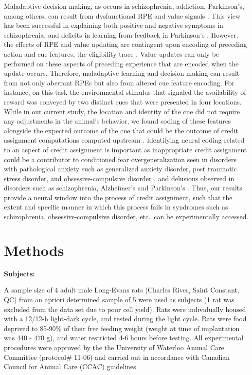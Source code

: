 \documentclass[11pt]{article}
\let\cite=\citep
\begin{document}
Maladaptive decision making, as occurs in schizophrenia, addiction, Parkinson's, among others, can result from dysfunctional RPE and value signals \cite{Frank2004,Gradin2011,Maia2011}. This view has been successful in explaining both positive and negative symptoms in schizophrenia, and deficits in learning from feedback in Parkinson's \cite{Frank2004,Gradin2011}. However, the effects of RPE and value updating are contingent upon encoding of preceding action and cue features, the eligibility trace \cite{sutton1998,Lee2012}. Value updates can only be performed on these aspects of preceding experience that are encoded when the update occurs. Therefore, maladaptive learning and decision making can result from not only aberrant RPEs but also from altered cue feature encoding. For instance, on this task the environmental stimulus that signaled the availability of reward was conveyed by two distinct cues that were presented in four locations. While in our current study, the location and identity of the cue did not require any adjustments in the animal’s behavior, we found coding of these features alongside the expected outcome of the cue that could be the outcome of credit assignment computations computed upstream \cite{Chau2015,Akaishi2016,Asaad2017,Noonan2017}. Identifying neural coding related to an aspect of credit assignment is important as inappropriate credit assignment could be a contributor to conditioned fear overgeneralization seen in disorders with pathological anxiety such as generalized anxiety disorder, post traumatic stress disorder, and obsessive-compulsive disorder \cite{Kaczkurkin2013,Lissek2014,Kaczkurkin2017}, and delusions observed in disorders such as schizophrenia, Alzheimer's and Parkinson's \cite{Kapur2003,Corlett2010}. Thus, our results provide a neural window into the process of credit assignment, such that the extent and specific manner in which this process fails in syndromes such as schizophrenia, obsessive-compulsive disorder, etc.\ can be experimentally accessed.

\section*{Methods}

{\bf Subjects:}

A sample size of 4 adult male Long-Evans rats (Charles River, Saint Constant, QC) from an apriori determined sample of 5 
were used as subjects (1 rat was excluded from the data set due to poor cell yield). Rats were individually housed with a 12/12-h
light-dark cycle, and tested during the light cycle. Rats were food
deprived to 85-90\% of their free feeding weight (weight at time of
implantation was 440 - 470 g), and water restricted 4-6 hours before
testing. All experimental procedures were approved by the the
University of Waterloo Animal Care Committee (protocol\# 11-06) and
carried out in accordance with Canadian Council for Animal Care (CCAC)
guidelines.
\end{document}

